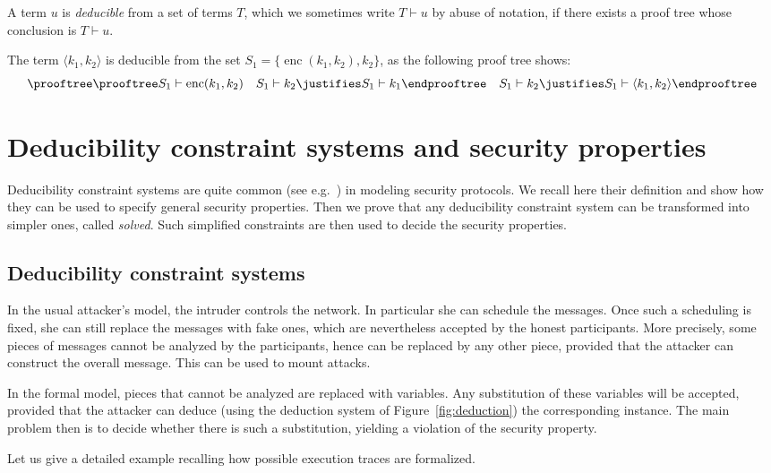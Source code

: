 \documentclass[acmtocl,acmnow]{acmtrans2m}
\newcommand{\pair}[2]{\langle{#1},{#2}\rangle}
\newcommand{\enc}{\operatorname{enc}}
\newcommand{\dedsys}[1]{deducibility constraint system}
\newcommand{\Dedsyss}[1]{Deducibility constraint systems}
\begin{document}
A term $u$ is \emph{deducible} from a set of terms $T$, which we sometimes
write $T\vdash u$ by abuse of notation, if there exists a proof tree
whose conclusion is $T\vdash u$.

\begin{example}
The term $\pair{k_1}{k_2}$ is deducible from the set $S_1=\{\enc(k_1,k_2),k_2\}$,
as the following proof tree shows:
\[\prooftree
\prooftree
S_1\vdash \enc(k_1,k_2)\quad S_1\vdash k_2
\justifies
S_1\vdash k_1
\endprooftree
\quad
S_1\vdash k_2
\justifies
S_1\vdash \pair{k_1}{k_2}
\endprooftree
\]
\end{example}

\section{\Dedsyss{} and security properties}
Deducibility constraint systems
are quite common (see e.g.~\cite{MS01,CS03}) in modeling security protocols. 
 We recall
here their definition and show how they can be used to specify general security properties. Then we prove that
any \dedsys{} can be transformed into  simpler ones, called \emph{solved}. Such simplified constraints are then used to decide the security
properties.

\subsection{\Dedsyss{}}\label{sec:systems}

In the usual attacker's model, the intruder controls the network. In particular
she can schedule the messages. Once such a scheduling is fixed, she can
still replace the messages with fake ones, which are nevertheless accepted
by the honest participants. More precisely, some pieces of messages
cannot be analyzed by the participants, hence can be replaced by any
other piece, provided that the attacker can construct the overall message. 
This can be used to mount attacks. 

In the formal model, pieces that cannot be analyzed are replaced with variables.
Any substitution of these variables will be accepted, provided that the
attacker can deduce (using the deduction system of Figure~\ref{fig:deduction})
the corresponding instance. The main problem then is to decide whether
there is such a substitution, yielding a violation of the security property.

Let us give a detailed example recalling how possible execution traces are
formalized.
\end{document}

